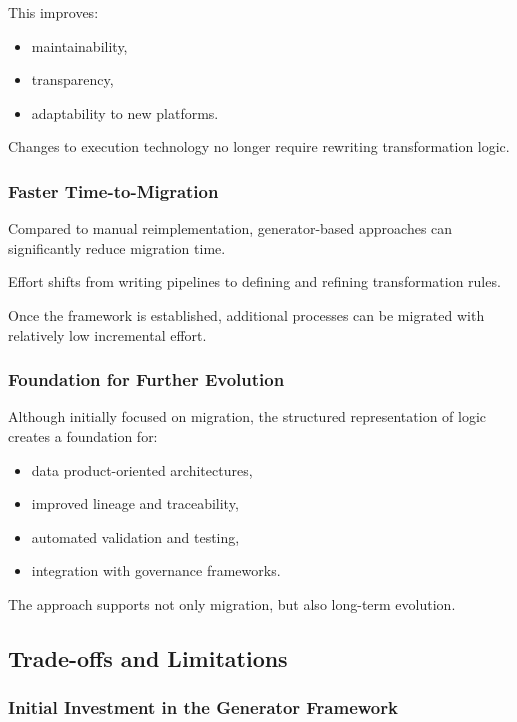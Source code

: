 \documentclass[11pt,a4paper]{article}
\begin{document}
This improves:
\begin{itemize}
  \item maintainability,
  \item transparency,
  \item adaptability to new platforms.
\end{itemize}

Changes to execution technology no longer require rewriting transformation logic.

\subsubsection{Faster Time-to-Migration}

Compared to manual reimplementation, generator-based approaches can significantly reduce migration time.

Effort shifts from writing pipelines to defining and refining transformation rules.

Once the framework is established, additional processes can be migrated with relatively low incremental effort.

\subsubsection{Foundation for Further Evolution}

Although initially focused on migration, the structured representation of logic creates a foundation for:
\begin{itemize}
  \item data product-oriented architectures,
  \item improved lineage and traceability,
  \item automated validation and testing,
  \item integration with governance frameworks.
\end{itemize}

The approach supports not only migration, but also long-term evolution.

\subsection{Trade-offs and Limitations}

\subsubsection{Initial Investment in the Generator Framework}
\end{document}
